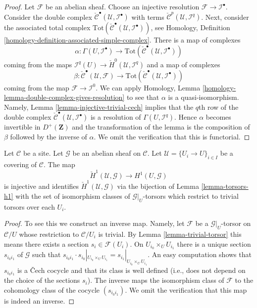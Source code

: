 \begin{proof}
Let $\mathcal{F}$ be an abelian sheaf. Choose an injective resolution
$\mathcal{F} \to \mathcal{I}^\bullet$. Consider the double complex
$\check{\mathcal{C}}^\bullet(\mathcal{U}, \mathcal{I}^\bullet)$
with terms $\check{\mathcal{C}}^p(\mathcal{U}, \mathcal{I}^q)$.
Next, consider the associated total complex
$\text{Tot}(\check{\mathcal{C}}^\bullet(\mathcal{U}, \mathcal{I}^\bullet))$,
see Homology, Definition \ref{homology-definition-associated-simple-complex}.
There is a map of complexes
$$
\alpha :
\Gamma(U, \mathcal{I}^\bullet)
\longrightarrow
\text{Tot}(\check{\mathcal{C}}^\bullet(\mathcal{U}, \mathcal{I}^\bullet))
$$
coming from the maps
$\mathcal{I}^q(U) \to \check{H}^0(\mathcal{U}, \mathcal{I}^q)$
and a map of complexes
$$
\beta :
\check{\mathcal{C}}^\bullet(\mathcal{U}, \mathcal{F})
\longrightarrow
\text{Tot}(\check{\mathcal{C}}^\bullet(\mathcal{U}, \mathcal{I}^\bullet))
$$
coming from the map $\mathcal{F} \to \mathcal{I}^0$.
We can apply
Homology, Lemma \ref{homology-lemma-double-complex-gives-resolution}
to see that $\alpha$ is a quasi-isomorphism.
Namely, Lemma \ref{lemma-injective-trivial-cech} implies that
the $q$th row of the double complex
$\check{\mathcal{C}}^\bullet(\mathcal{U}, \mathcal{I}^\bullet)$ is a
resolution of $\Gamma(U, \mathcal{I}^q)$.
Hence $\alpha$ becomes invertible in $D^{+}(\mathbf{Z})$ and
the transformation of the lemma is the composition of $\beta$
followed by the inverse of $\alpha$. We omit the verification
that this is functorial.
\end{proof}

\begin{lemma}
\label{lemma-cech-h1}
Let $\mathcal{C}$ be a site. Let $\mathcal{G}$ be an abelian sheaf
on $\mathcal{C}$. Let $\mathcal{U} = \{U_i \to U\}_{i \in I}$ be a
covering of $\mathcal{C}$. The map
$$
\check{H}^1(\mathcal{U}, \mathcal{G})
\longrightarrow
H^1(U, \mathcal{G})
$$
is injective and identifies $\check{H}^1(\mathcal{U}, \mathcal{G})$ via
the bijection of Lemma \ref{lemma-torsors-h1}
with the set of isomorphism classes of $\mathcal{G}|_U$-torsors
which restrict to trivial torsors over each $U_i$.
\end{lemma}

\begin{proof}
To see this we construct an inverse map. Namely, let $\mathcal{F}$ be a
$\mathcal{G}|_U$-torsor on $\mathcal{C}/U$ whose restriction to
$\mathcal{C}/U_i$ is trivial. By Lemma \ref{lemma-trivial-torsor}
this means there
exists a section $s_i \in \mathcal{F}(U_i)$. On $U_{i_0} \times_U U_{i_1}$
there is a unique section $s_{i_0i_1}$ of $\mathcal{G}$ such that
$s_{i_0i_1} \cdot s_{i_0}|_{U_{i_0} \times_U U_{i_1}} =
s_{i_1}|_{U_{i_0} \times_U U_{i_1}}$. An easy computation shows
that $s_{i_0i_1}$ is a {\v C}ech cocycle and that its class is well
defined (i.e., does not depend on the choice of the sections $s_i$).
The inverse maps the isomorphism class of $\mathcal{F}$ to the cohomology
class of the cocycle $(s_{i_0i_1})$.
We omit the verification that this map is indeed an inverse.
\end{proof}

